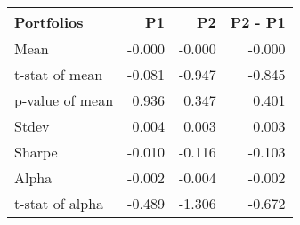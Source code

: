\begin{tabular}{lrrr}
\toprule
Portfolios & P1 & P2 & P2 - P1 \\
\midrule
Mean & -0.000 & -0.000 & -0.000 \\
t-stat of mean & -0.081 & -0.947 & -0.845 \\
p-value of mean & 0.936 & 0.347 & 0.401 \\
Stdev & 0.004 & 0.003 & 0.003 \\
Sharpe & -0.010 & -0.116 & -0.103 \\
Alpha & -0.002 & -0.004 & -0.002 \\
t-stat of alpha & -0.489 & -1.306 & -0.672 \\
\bottomrule
\end{tabular}
